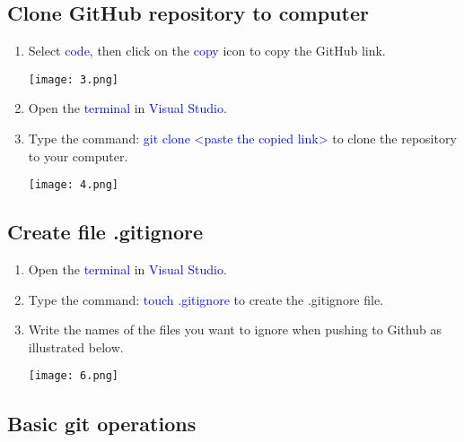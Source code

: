 \documentclass[12pt]{scrartcl}
\begin{document}
\newpage

\subsection{Clone GitHub repository to computer}

\begin{enumerate}
    \item Select \textcolor{blue}{code}, then click on the \textcolor{blue}{copy} icon to copy the GitHub link.
        \begin{center}
            \texttt{[image: 3.png]}
        \end{center}
    \item Open the \textcolor{blue}{terminal} in \textcolor{blue}{Visual Studio}.
    \item Type the command: \textcolor{blue}{git clone <paste the copied link>} to clone the repository to your computer.
        \begin{center}
            \texttt{[image: 4.png]}
        \end{center}
    
\end{enumerate}


\newpage
\subsection{Create file .gitignore}

\begin{enumerate}
    \item Open the \textcolor{blue}{terminal} in \textcolor{blue}{Visual Studio}.
    \item Type the command: \textcolor{blue}{touch .gitignore} to create the .gitignore file.
    \item Write the names of the files you want to ignore when pushing to Github as illustrated below.

        \begin{center}
            \texttt{[image: 6.png]}
        \end{center}
    
\end{enumerate}

\newpage
\subsection{Basic git operations}
\end{document}

